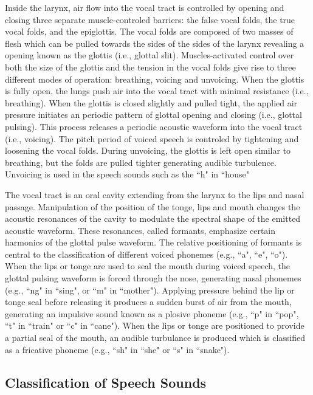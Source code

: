 Inside the larynx, air flow into the vocal tract is controlled by opening and closing three separate muscle-controled barriers: the false vocal folds, the true vocal folds, and the epiglottis. The vocal folds are composed of two masses of flesh which can be pulled towards the sides of the sides of the larynx revealing a opening known as the glottis (i.e., glottal slit). Muscles-activated control over both the size of the glottis and the tension in the vocal folds give rise to three different modes of operation: breathing, voicing and unvoicing. When the glottis is fully open, the lungs push air into the vocal tract with minimal resistance (i.e., breathing). When the glottis is closed slightly and pulled tight, the applied air pressure initiates an periodic pattern of glottal opening and closing (i.e., glottal pulsing). This process releases a periodic acoustic waveform into the vocal tract (i.e., voicing). The pitch period of voiced speech is controled by tightening and loosening the vocal folds. During unvoicing, the glottis is left open similar to breathing, but the folds are pulled tighter generating audible turbulence. Unvoicing is used in the speech sounds such as the ``h" in ``house"

The vocal tract is an oral cavity extending from the larynx to the lips and nasal passage. Manipulation of the position of the tonge, lips and mouth changes the acoustic resonances of the cavity to modulate the spectral shape of the emitted acoustic waveform. These resonances, called formants, emphasize certain harmonics of the glottal pulse waveform. The relative positioning of formants is central to the classification of different voiced phonemes (e.g., ``a", ``e", ``o"). When the lips or tonge are used to seal the mouth during voiced speech, the glottal pulsing waveform is forced through the nose, generating nasal phonemes (e.g., ``ng" in ``sing", or ``m" in ``mother"). Applying pressure behind the lip or tonge seal before releasing it produces a sudden burst of air from the mouth, generating an impulsive sound known as a plosive phoneme (e.g., ``p" in ``pop", ``t" in ``train" or ``c" in ``cane"). When the lips or tonge are positioned to provide a partial seal of the mouth, an audible turbulance is produced which is classified as a fricative phoneme (e.g., ``sh" in ``she" or ``s" in ``snake"). 

\subsection{Classification of Speech Sounds}

